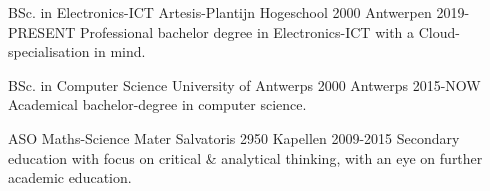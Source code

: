
    \begin{cventries}
    
        \cventry
            {BSc. in Electronics-ICT} %
            {Artesis-Plantijn Hogeschool} %
            {2000 Antwerpen} %
            {2019-PRESENT} %
            {Professional bachelor degree in Electronics-ICT with a Cloud-specialisation in mind.}
            
        \cventry
            {BSc. in Computer Science} %
            {University of Antwerps} %
            {2000 Antwerps} %
            {2015-NOW} %
            {Academical bachelor-degree in computer science.}
            
        \cventry
            {ASO Maths-Science} %
            {Mater Salvatoris} %
            {2950 Kapellen} %
            {2009-2015} %
            {Secondary education with focus on critical \& analytical thinking, with an eye on further academic education.}
            
        \end{cventries}